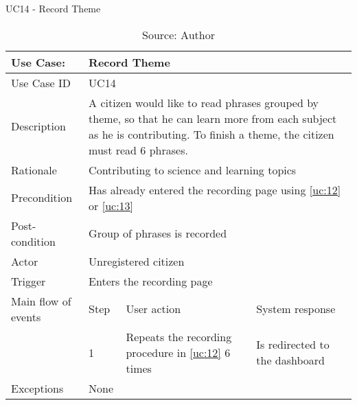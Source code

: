 \begin{table}[ht]
\centering
\caption{UC14 - Record Theme}
\label{uc:14}
\begin{tabular}{|p{3cm}|p{1cm}|p{5cm}|p{5cm}|}
\hline
Use Case:       & \multicolumn{3}{p{11cm}|}{Record Theme} \\ \hline
Use Case ID     & \multicolumn{3}{p{11cm}|}{UC14} \\ \hline
Description     & \multicolumn{3}{p{11cm}|}{A citizen would like to read phrases grouped by theme, so that he can learn more from each subject as he is contributing. To finish a theme, the citizen must read 6 phrases.} \\ \hline
Rationale       & \multicolumn{3}{p{11cm}|}{Contributing to science and learning topics} \\ \hline
Precondition    & \multicolumn{3}{p{11cm}|}{Has already entered the recording page using \ref{uc:12} or \ref{uc:13}} \\ \hline
Post-condition  & \multicolumn{3}{p{11cm}|}{Group of phrases is recorded} \\ \hline
Actor           & \multicolumn{3}{p{11cm}|}{Unregistered citizen} \\ \hline
Trigger         & \multicolumn{3}{p{11cm}|}{Enters the recording page} \\ \hline
Main flow of events & Step  & User action & System response \\ \hline
                    & 1     & Repeats the recording procedure in \ref{uc:12} 6 times & Is redirected to the dashboard \\ \hline
Exceptions      & \multicolumn{3}{p{11cm}|}{None} \\ \hline
\end{tabular}
\caption*{Source: Author}
\end{table}

